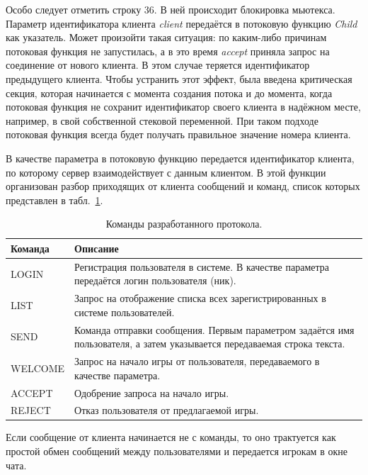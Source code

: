 \documentclass[12pt, a4paper, oneside]{article}
\begin{document}
\begin{figure}[b!]

\end{figure}



Особо следует отметить строку 36. В ней происходит блокировка мьютекса. Параметр идентификатора клиента \textit{client} передаётся в потоковую функцию \textit{Child} как указатель. Может произойти такая ситуация: по каким-либо причинам потоковая функция не запустилась, а в это время \textit{accept} приняла запрос на соединение от нового клиента. В этом случае теряется идентификатор предыдущего клиента. Чтобы устранить этот эффект, была введена критическая секция, которая начинается с момента создания потока и до момента, когда потоковая функция не сохранит идентификатор своего клиента в надёжном месте, например, в свой собственной стековой переменной. При таком подходе потоковая функция всегда будет получать правильное значение номера клиента. 

В качестве параметра в потоковую функцию передается идентификатор клиента, по которому сервер взаимодействует с данным клиентом. В этой функции организован разбор приходящих от клиента сообщений и команд, список которых представлен в табл.~\ref{tbl:protocol}.

\begin{table}[t!]
\caption{Команды разработанного протокола.}
\label{tbl:protocol}
\begin{tabular}{m{3cm}m{14cm}}\toprule
Команда & Описание \\ \midrule
LOGIN & Регистрация пользователя в системе. В качестве параметра передаётся логин пользователя (ник). \\
LIST & Запрос на отображение списка всех зарегистрированных в системе пользователей. \\
SEND & Команда отправки сообщения. Первым параметром задаётся имя пользователя, а затем указывается передаваемая строка текста. \\
WELCOME & Запрос на начало игры от пользователя, передаваемого в качестве параметра. \\
ACCEPT & Одобрение запроса на начало игры. \\
REJECT & Отказ пользователя от предлагаемой игры. \\
\bottomrule
\end{tabular}
\end{table}

Если сообщение от клиента начинается не с команды, то оно трактуется как простой обмен сообщений между пользователями и передается игрокам в окне чата.
\end{document}
